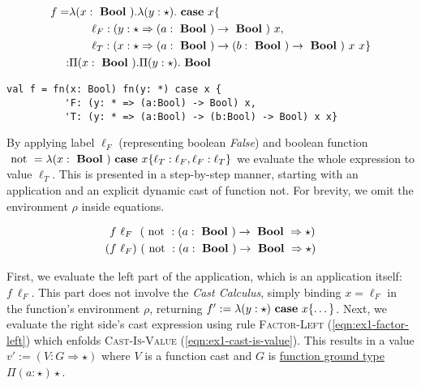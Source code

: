 \begin{equation}\label{eqn:ccldlc-example1}
\begin{split}
f = & \lambda (x: \text{ \textbf{Bool} })
. \lambda (y: \star )
. \text{ \textbf{case} } x \{ \\
& \qquad \ell_F: (y : \star \Rightarrow (a:\text{ \textbf{Bool} }) \rightarrow \text{ \textbf{Bool} })~x, \\
& \qquad \ell_T: (x : \star \Rightarrow (a:\text{ \textbf{Bool} }) \rightarrow (b:\text{ \textbf{Bool} }) \rightarrow \text{ \textbf{Bool} })~x~x \} \\
: & \Pi(x : \text{ \textbf{Bool} }) . \Pi (y: \star ) . \text{ \textbf{Bool} }
\end{split}
\end{equation}

\begin{lstlisting}[language=ldgv,
  label=lst:ccldgv-example1,
  caption=LDGV: CCLDGV example ``dependent function cast'']
val f = fn(x: Bool) fn(y: *) case x {
          'F: (y: * => (a:Bool) -> Bool) x,
          'T: (y: * => (a:Bool) -> (b:Bool) -> Bool) x x}
\end{lstlisting}

By applying label $\ell_F$ (representing boolean \emph{False}) and boolean function $\text{ not } = \lambda (x:\text{ \textbf{Bool} }) \text{ \textbf{case} } x \{ \ell_T: \ell_F, \ell_F: \ell_T\}$ we evaluate the whole expression to value $\ell_T$. This is presented in a step-by-step manner, starting with an application and an explicit dynamic cast of function not. For brevity, we omit the environment $\rho$ inside equations.

\begin{align}
& f~\ell_F~~(\text{ not } : (a:\text{ \textbf{Bool} }) \rightarrow \text{ \textbf{Bool} } \Rightarrow \star) \\
( & f~\ell_F)~(\text{ not } : (a:\text{ \textbf{Bool} }) \rightarrow \text{ \textbf{Bool} } \Rightarrow \star)
\end{align}

First, we evaluate the left part of the application, which is an application itself: $f~\ell_F$. This part does not involve the \emph{Cast Calculus}, simply binding $x=\ell_F$ in the function's environment $\rho$, returning $f' := \lambda (y:\star) \text{ \textbf{case} } x \{ \dots \}$. Next, we evaluate the right side's cast expression using rule \textsc{Factor-Left} (\ref{eqn:ex1-factor-left}) which enfolds \textsc{Cast-Is-Value} (\ref{eqn:ex1-cast-is-value}). This results in a value $v' := (V : G \Rightarrow \star)$ where $V$ is a function cast and $G$ is \underline{function ground type} $\Pi(a:\star)\star$.

